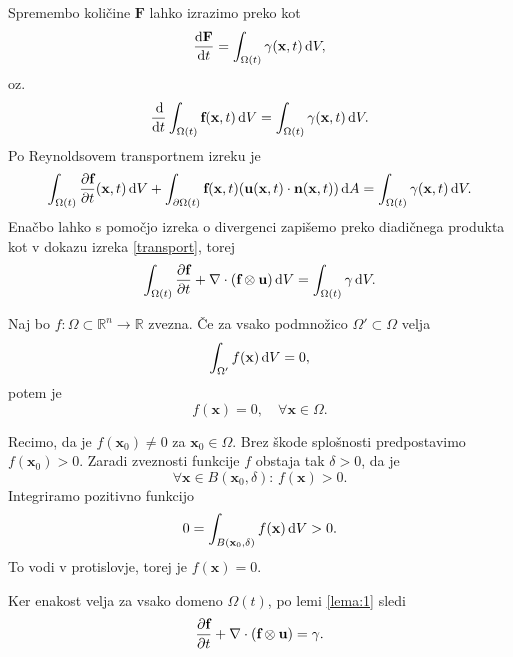 \documentclass[mat2, tisk]{fmfdelo}
\newcommand{\R}{\mathbb R}
\newcommand{\bd}{\textbf}
\begin{document}
Spremembo količine $\bd{F}$ lahko izrazimo preko \bd{\text{$\gamma$}} kot 
\begin{equation*}
\frac{\dif \bd{F}}{\dif t} = \int_{\Omega(t)} \bd{\text{$\gamma$}}(\bd{x}, t) \dif V,
\end{equation*}
 oz. 
\begin{equation*}
\frac{\dif}{\dif t} \int_{\Omega(t)} \bd{f}(\bd{x}, t) \dif V = \int_{\Omega(t)} \bd{\text{$\gamma$}}(\bd{x}, t) \dif V.
\end{equation*}
Po Reynoldsovem transportnem izreku je
\begin{equation*}
\int_{\Omega(t)} \frac{\partial \bd{f}}{\partial t}(\bd{x}, t) \dif V + \int_{\partial \Omega(t)} \bd{f}(\bd{x}, t) (\bd{u}(\bd{x}, t) \cdot \bd{n}(\bd{x}, t)) \dif A = \int_{\Omega(t)} \bd{\text{$\gamma$}}(\bd{x}, t) \dif V.
\end{equation*}
Enačbo lahko s pomočjo izreka o divergenci zapišemo preko diadičnega produkta kot v dokazu izreka \ref{transport}, torej
\begin{equation*}
\int_{\Omega(t)} \frac{\partial \bd{f}}{\partial t} + \nabla \cdot (\bd{f} \otimes \bd{u}) \dif V = \int_{\Omega(t)} \bd{\text{$\gamma$}} \dif V.
\end{equation*}

\begin{lema}
  \label{lema:1}
Naj bo $f: \Omega \subset \R^n \rightarrow \R$ zvezna. 
Če za vsako podmnožico $\Omega' \subset \Omega$ velja 
$$
\int_{\Omega'} f(\bd{x}) \dif V = 0,
$$
potem je 
$$
f(\bd{x}) = 0, \quad \forall \bd{x} \in \Omega.
$$
\end{lema}

\begin{dokaz}
Recimo, da je $f(\bd{x}_0) \neq 0$ za $\bd{x}_0 \in \Omega$. Brez škode 
splošnosti predpostavimo $f(\bd{x}_0) > 0$. Zaradi 
zveznosti funkcije $f$ obstaja tak $\delta > 0$, da je 
$$
\forall \bd{x} \in B(\bd{x}_0, \delta):\, f(\bd{x}) > 0.
$$
Integriramo pozitivno funkcijo 
$$
0 = \int_{B(\bd{x}_0, \delta)} f(\bd{x}) \dif V > 0.
$$
To vodi v protislovje, torej je $f(\bd{x}) = 0$.
\end{dokaz}

Ker enakost velja za vsako domeno $\Omega(t)$, po lemi \ref{lema:1} sledi
\begin{equation*}
\frac{\partial \bd{f}}{\partial t}+ \nabla \cdot (\bd{f} \otimes \bd{u}) = \bd{\text{$\gamma$}}.
\end{equation*}
\end{document}
